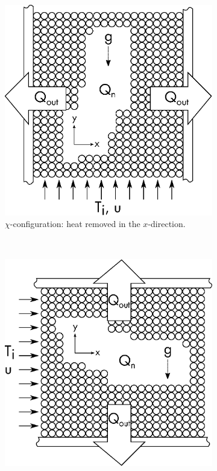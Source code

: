 \begin{figure}[!ht]
    \centering
    \begin{subfigure}[b]{0.44\textwidth}
        \includegraphics[width = \textwidth]{figures/x-domain.eps}
        \caption{$\chi$-configuration: heat removed in the $x$-direction.}\label{fig:x-domain}
    \end{subfigure}
    ~
    \begin{subfigure}[b]{0.44\textwidth}
        \includegraphics[width = \textwidth]{figures/y-domain.eps}

\end{subfigure}
\end{figure}
